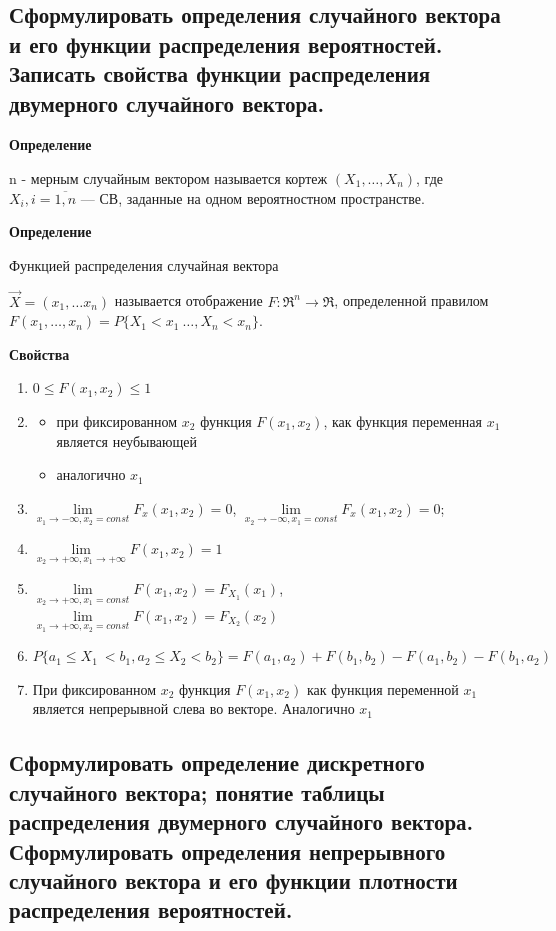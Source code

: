 \subsection{Сформулировать определения случайного вектора и его функции распределения вероятностей. Записать свойства функции распределения двумерного случайного вектора.}

\textbf{Определение}

n - мерным случайным вектором называется кортеж $(X_1, \dots, X_n)$, где $X_i, i=\overline{1,n}$ --- СВ, заданные на одном вероятностном пространстве.

\textbf{Определение}

Функцией распределения случайная вектора

$\overrightarrow{X} = (x_1, \dots x_n)$ называется отображение $F: \Re^n \rightarrow \Re$, определенной правилом $F(x_1, \dots, x_n) = P\{X_1 < x_1\ \dots, X_n < x_n\}$.

\textbf{Свойства}

\begin{enumerate}[label=\arabic*.]
	\item $0 \leq F(x_1, x_2) \leq 1$
	\item \begin{itemize}
		\item при фиксированном $x_2$ функция $F(x_1, x_2)$, как функция переменная $x_1$ является неубывающей
		\item аналогично $x_1$
	\end{itemize}
	\item $\lim\limits_{x_1 \rightarrow -\infty, x_2 = const}F_x(x_1, x_2) = 0$, $\lim\limits_{x_2 \rightarrow -\infty, x_1 = const}F_x(x_1, x_2) = 0$;
	\item $\lim\limits_{x_2 \rightarrow +\infty, x_1 \rightarrow +\infty}F(x_1, x_2) = 1$
	\item $\lim\limits_{x_2 \rightarrow +\infty, x_1 = const}F(x_1, x_2) = F_{X_1}(x_1)$, $\lim\limits_{x_1 \rightarrow +\infty, x_2 = const}F(x_1, x_2) = F_{X_2}(x_2)$
	\item $P\{a_1 \leq X_1\ < b_1, a_2 \leq X_2 < b_2\} = F(a_1, a_2) + F(b_1, b_2) - F(a_1, b_2) - F(b_1, a_2)$
	\item При фиксированном $x_2$ функция $F(x_1, x_2)$ как функция переменной $x_1$ является непрерывной слева во векторе. Аналогично $x_1$
\end{enumerate}

\subsection{Сформулировать определение дискретного случайного вектора; понятие таблицы распределения двумерного случайного вектора. Сформулировать определения непрерывного случайного вектора и его функции плотности распределения вероятностей.}

